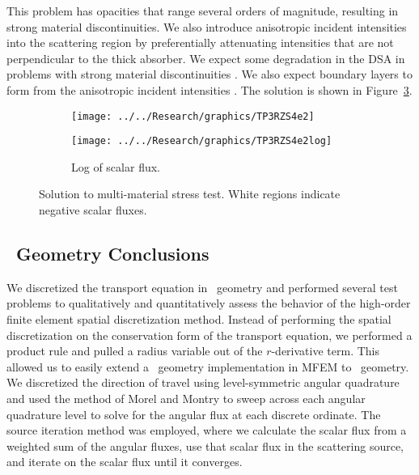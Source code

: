 \documentclass[12pt]{article}
\begin{document}
This problem has opacities that range several orders of magnitude, resulting in strong material discontinuities. We also introduce anisotropic incident intensities into the scattering region by preferentially attenuating intensities that are not perpendicular to the thick absorber. We expect some degradation in the DSA in problems with strong material discontinuities \cite{WangDissertation}. We also expect boundary layers to form from the anisotropic incident intensities \cite{AdamsDFEMDiffLimit}. The solution is shown in Figure~\ref{fig:RZMultiMaterial}.

\begin{figure}[!htb]
\centering
\begin{subfigure}{0.8\textwidth}
\centering
\texttt{[image: ../../Research/graphics/TP3RZS4e2]}
\label{fig:TP2RZS4e4}
\end{subfigure}
\begin{subfigure}{0.8\textwidth}
\centering
\texttt{[image: ../../Research/graphics/TP3RZS4e2log]}
\caption{Log of scalar flux.}
\label{fig:TP2RZS4e4}
\end{subfigure}
\caption{Solution to multi-material stress test. White regions indicate negative scalar fluxes.}
\label{fig:RZMultiMaterial}
\end{figure}

\subsection{\RZ\ Geometry Conclusions}
\label{sec:RZConclusions}
We discretized the transport equation in \RZ\ geometry and performed several test problems to qualitatively and quantitatively assess the behavior of the high-order finite element spatial discretization method. Instead of performing the spatial discretization on the conservation form of the transport equation, we performed a product rule and pulled a radius variable out of the $r$-derivative term. This allowed us to easily extend a \XY\ geometry implementation in MFEM to \RZ\ geometry. We discretized the direction of travel using level-symmetric angular quadrature and used the method of Morel and Montry to sweep across each angular quadrature level to solve for the angular flux at each discrete ordinate. The source iteration method was employed, where we calculate the scalar flux from a weighted sum of the angular fluxes, use that scalar flux in the scattering source, and iterate on the scalar flux until it converges.
\end{document}
